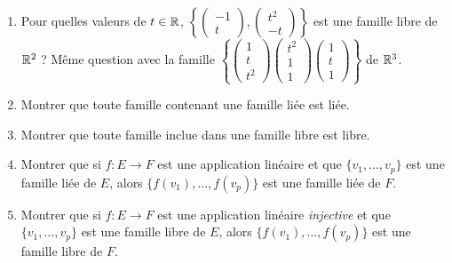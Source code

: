 \begin{frame}
\begin{miniexercice}
\begin{enumerate}
  \item Pour quelles valeurs de $t\in\mathbb{R}$, 
  $\left\{ 
  \left(\begin{smallmatrix} -1 \\ t \end{smallmatrix}\right),
  \left(\begin{smallmatrix} t^2 \\ -t \end{smallmatrix}\right)
  \right\}$ 
  est une famille libre de $\mathbb{R}^2$ ?
  Même question avec la famille 
  $\left\{ 
  \left(\begin{smallmatrix} 1 \\ t \\ t^2 \end{smallmatrix}\right) 
  \left(\begin{smallmatrix} t^2 \\ 1 \\ 1 \end{smallmatrix}\right) 
  \left(\begin{smallmatrix} 1 \\ t \\ 1 \end{smallmatrix}\right) 
  \right\}$ de $\mathbb{R}^3$.
  
  
  \item Montrer que toute famille contenant une famille liée est liée.

  \item Montrer que toute famille inclue dans une famille libre est libre.
  
  \item Montrer que si $f : E \to F$ est une application linéaire et que 
  $\{ v_1, \ldots, v_p \}$ est une famille liée de $E$, alors 
  $\{ f(v_1), \ldots, f(v_p) \}$ est une famille liée de $F$.
  
  \item Montrer que si $f : E \to F$ est une application linéaire \emph{injective}
  et que $\{ v_1, \ldots, v_p \}$ est une famille libre de $E$, alors 
  $\{ f(v_1), \ldots, f(v_p) \}$ est une famille libre de $F$.  

\end{enumerate}
\end{miniexercice}
\end{frame}


